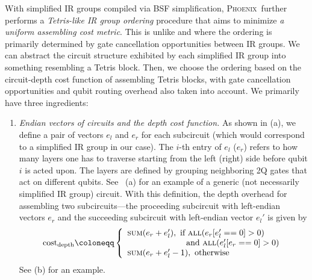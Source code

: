 \documentclass[conference,9pt]{IEEEtran}
\newcommand{\phoenix}{\textsc{Phoenix}}
\newcommand{\eRrightPre}{e_r}
\newcommand{\eLeftPost}{e_l'}
\begin{document}
    With simplified IR groups compiled via BSF simplification, \phoenix\ further performs a \emph{Tetris-like IR group ordering} procedure that aims to minimize \textit{a uniform assembling cost metric}. This is unlike \cite{li2022paulihedral} and \cite{jin2024tetris} where the ordering is primarily determined by gate cancellation opportunities between IR groups. We can abstract the circuit structure exhibited by each simplified IR group into something resembling a Tetris block. Then, we choose the ordering based on the circuit-depth cost function of assembling Tetris blocks, with gate cancellation opportunities and qubit routing overhead also taken into account. We primarily have three ingredients:
    \begin{enumerate}
        \item \textit{Endian vectors of circuits and the depth cost function.} As shown in  (a), we define a pair of vectors $e_l$ and $e_r$ for each subcircuit (which would correspond to a simplified IR group in our case). The $i$-th entry of $e_l$ ($e_r$) refers to how many layers one has to traverse starting from the left (right) side before qubit $i$ is acted upon. The layers are defined by grouping neighboring 2Q gates that act on different qubits. See~ (a) for an example of a generic (not necessarily simplified IR group) circuit.
        With this definition, the depth overhead for assembling two subcircuits---the proceeding subcircuit with left-endian vectors $e_r$ and the succeeding subcircuit with left-endian vector $e_l'$ is given by
        \begin{align*}
            \mathrm{cost}_\mathrm{depth} \coloneqq  
                    \left\{
                    \begin{array}{ll}
                    \textsc{sum}(\eRrightPre + \eLeftPost),  \text{ if } \textsc{all}(\eRrightPre[\eLeftPost == 0] > 0) \\\qquad \text{    }\qquad\text{    }\qquad\text{   }\text{and }\textsc{all}(\eLeftPost[\eRrightPre == 0] > 0) \\
                    \textsc{sum}(\eRrightPre + \eLeftPost - 1), \text{ otherwise    }
                    \end{array}
                    \right.
        \end{align*}
        See  (b) for an example. %

\end{enumerate}
\end{document}
